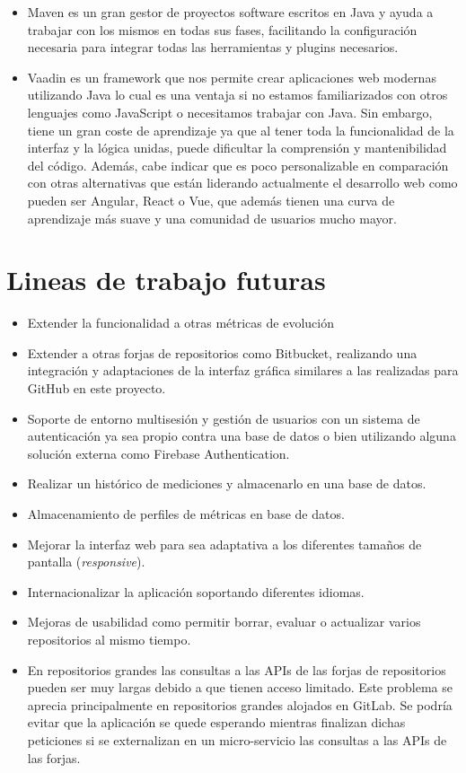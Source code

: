 \begin{itemize}
	\item Maven es un gran gestor de proyectos software escritos en Java y ayuda a trabajar con los mismos en todas sus fases, facilitando la configuración necesaria para integrar todas las herramientas y plugins necesarios.
	\item Vaadin es un framework que nos permite crear aplicaciones web modernas utilizando Java lo cual es una ventaja si no estamos familiarizados con otros lenguajes como JavaScript o necesitamos trabajar con Java. Sin embargo, tiene un gran coste de aprendizaje ya que al tener toda la funcionalidad de la interfaz y la lógica unidas, puede dificultar la comprensión y mantenibilidad del código. Además, cabe indicar que es poco personalizable en comparación con otras alternativas que están liderando actualmente el desarrollo web como pueden ser Angular, React o Vue, que además tienen una curva de aprendizaje más suave y una comunidad de usuarios mucho mayor.
	
\end{itemize}

\newpage
\section{Lineas de trabajo futuras}

\begin{itemize}
	\item Extender la funcionalidad a otras métricas de evolución
	\item Extender a otras forjas de repositorios como Bitbucket, realizando una integración y adaptaciones de la interfaz gráfica similares a las realizadas para GitHub en este proyecto.
	\item Soporte de entorno multisesión y gestión de usuarios con un sistema de autenticación ya sea propio contra una base de datos o bien utilizando alguna solución externa como Firebase Authentication.
	\item Realizar un histórico de mediciones y almacenarlo en una base de datos.
	\item Almacenamiento de perfiles de métricas en base de datos.
	\item Mejorar la interfaz web para sea adaptativa a los diferentes tamaños de pantalla (\textit{responsive}).
	\item Internacionalizar la aplicación soportando diferentes idiomas.
	\item Mejoras de usabilidad como permitir borrar, evaluar o actualizar varios repositorios al mismo tiempo.
	\item En repositorios grandes las consultas a las APIs de las forjas de repositorios pueden ser muy largas debido a que tienen acceso limitado. Este problema se aprecia principalmente en repositorios grandes alojados en GitLab. Se podría evitar que la aplicación se quede esperando mientras finalizan dichas peticiones si se externalizan en un micro-servicio las consultas a las APIs de las forjas.
	
\end{itemize}